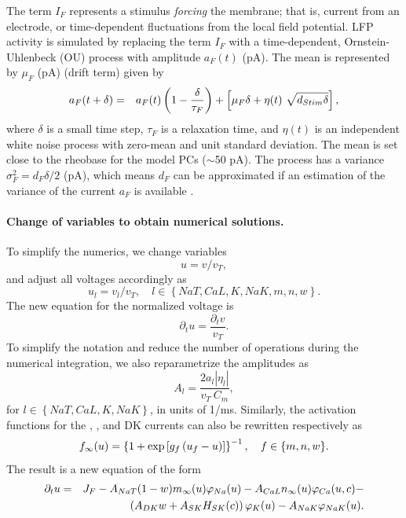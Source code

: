 \documentclass[12pt]{article}
\begin{document}
The term $I_{F}$ represents a stimulus \textit{forcing} the membrane; that is, current from an electrode, or time-dependent fluctuations from the local field potential. LFP activity is simulated by replacing the term $I_{F}$ with a  time-dependent, Ornstein-Uhlenbeck (OU) process with amplitude $a_{F}(t)$ (pA). The mean is represented by  $\mu_{F}$ (pA) (drift term)
\citep{rudolph2003characterization} given by \citep{gillespie1996exact} 
\begin{eqnarray}
{a}_{F}(t+\delta) &=& a_{F}(t) \left(1 -  \frac{\delta}{\tau_{F}}\right)  +
\left[ \mu_{F} \delta + \eta(t) ~\sqrt{d_{Stim} \delta}\right],
\label{eq:OU}
\end{eqnarray}
where $\delta$ is a small time step, $\tau_{F}$ is a relaxation time, and $\eta(t)$ is an independent
white noise process with zero-mean and unit standard deviation. The mean is set close to the rheobase for the model PCs ($\sim$50 pA). The process has a variance
$\sigma_{F}^2 = d_{F} \delta /2$ (pA), which means $d_{F}$ can be
approximated if an estimation of the variance of the current $a_{F}$ is
available \citep{rudolph2004method,destexhe2004novel}.  

\paragraph{Change of variables to obtain numerical solutions.}
To simplify the numerics, we change variables $$u = v/v_T,$$ and adjust all voltages accordingly as $$u_l = v_l/v_T, \quad l \in \left\{NaT,CaL,K,NaK,m,n,w \right\}.$$ 
The new equation for the normalized voltage is $$\partial_t u = \frac{\partial_t v}{v_T}.$$
To simplify the notation and reduce the number of operations during the numerical integration, we also reparametrize the amplitudes as 
\begin{equation}A_l = \frac{2 a_l |\eta_l|}{v_T~C_m}, \label{eq:normA}
\end{equation} 
for $l \in \left\{NaT,CaL,K,NaK \right\}$, in units of 1/ms. 
Similarly,
the activation functions for the {\Na}, {\Ca}, and DK currents can also be rewritten respectively
as 
\begin{equation}
f_{\infty}(u) = \left\{1 + \exp\left[g_f \left(u_f-u \right) \right]\right\}^{-1}, \quad{f \in  \left\{m,n,w \right\}}.
\end{equation}
The result is a new equation of the form
\begin{eqnarray}
\partial_t u &=& J_F -A_{NaT}(1-w)m_{\infty}(u) \varphi_{Na}(u) - A_{CaL}n_{\infty}(u) \varphi_{Ca}(u,c)- \notag \\
&& \left(A_{DK}w + A_{SK}H_{SK}(c)\right)\varphi_{K}(u)- A_{NaK}\varphi_{NaK}(u
).
\end{eqnarray}
 
\end{document}
